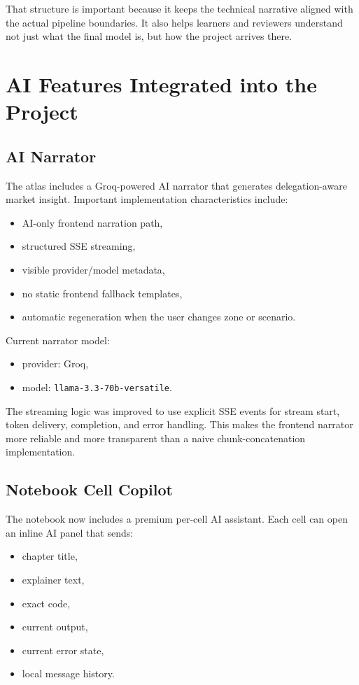 \documentclass[11pt,a4paper]{article}
\newcommand{\code}[1]{\texttt{#1}}
\begin{document}
That structure is important because it keeps the technical narrative aligned with the actual pipeline boundaries. It also helps learners and reviewers understand not just what the final model is, but how the project arrives there.

\section{AI Features Integrated into the Project}

\subsection{AI Narrator}

The atlas includes a Groq-powered AI narrator that generates delegation-aware market insight. Important implementation characteristics include:

\begin{itemize}
\item AI-only frontend narration path,
\item structured SSE streaming,
\item visible provider/model metadata,
\item no static frontend fallback templates,
\item automatic regeneration when the user changes zone or scenario.
\end{itemize}

Current narrator model:

\begin{itemize}
\item provider: Groq,
\item model: \code{llama-3.3-70b-versatile}.
\end{itemize}

The streaming logic was improved to use explicit SSE events for stream start, token delivery, completion, and error handling. This makes the frontend narrator more reliable and more transparent than a naive chunk-concatenation implementation.

\subsection{Notebook Cell Copilot}

The notebook now includes a premium per-cell AI assistant. Each cell can open an inline AI panel that sends:

\begin{itemize}
\item chapter title,
\item explainer text,
\item exact code,
\item current output,
\item current error state,
\item local message history.
\end{itemize}
\end{document}
